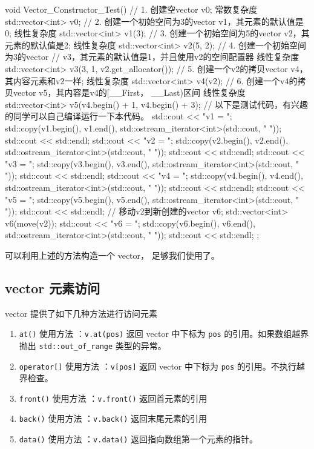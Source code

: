 \begin{cppcode}
void Vector_Constructor_Test() {
  // 1. 创建空vector v0;  常数复杂度
  std::vector<int> v0;
  // 2. 创建一个初始空间为3的vector v1，其元素的默认值是0; 线性复杂度
  std::vector<int> v1(3);
  // 3. 创建一个初始空间为5的vector v2，其元素的默认值是2; 线性复杂度
  std::vector<int> v2(5, 2);
  // 4. 创建一个初始空间为3的vector
  // v3，其元素的默认值是1，并且使用v2的空间配置器 线性复杂度
  std::vector<int> v3(3, 1, v2.get_allocator());
  // 5. 创建一个v2的拷贝vector v4， 其内容元素和v2一样; 线性复杂度
  std::vector<int> v4(v2);
  // 6. 创建一个v4的拷贝vector v5，其内容是v4的[__First， __Last)区间 线性复杂度
  std::vector<int> v5(v4.begin() + 1, v4.begin() + 3);
  // 以下是测试代码，有兴趣的同学可以自己编译运行一下本代码。
  std::cout << "v1 = ";
  std::copy(v1.begin(), v1.end(), std::ostream_iterator<int>(std::cout, " "));
  std::cout << std::endl;
  std::cout << "v2 = ";
  std::copy(v2.begin(), v2.end(), std::ostream_iterator<int>(std::cout, " "));
  std::cout << std::endl;
  std::cout << "v3 = ";
  std::copy(v3.begin(), v3.end(), std::ostream_iterator<int>(std::cout, " "));
  std::cout << std::endl;
  std::cout << "v4 = ";
  std::copy(v4.begin(), v4.end(), std::ostream_iterator<int>(std::cout, " "));
  std::cout << std::endl;
  std::cout << "v5 = ";
  std::copy(v5.begin(), v5.end(), std::ostream_iterator<int>(std::cout, " "));
  std::cout << std::endl;
  // 移动v2到新创建的vector v6;
  std::vector<int> v6(move(v2));
  std::cout << "v6 = ";
  std::copy(v6.begin(), v6.end(), std::ostream_iterator<int>(std::cout, " "));
  std::cout << std::endl;
};
\end{cppcode}

可以利用上述的方法构造一个 vector， 足够我们使用了。

\subsection{vector 元素访问}

vector 提供了如下几种方法进行访问元素

\begin{enumerate}
\item \texttt{at()}
使用方法 ：\texttt{v.at(pos)} 返回 vector 中下标为 \texttt{pos} 的引用。如果数组越界抛出 \texttt{std::out_of_range} 类型的异常。
\item \texttt{operator[]}
使用方法 ：\texttt{v[pos]} 返回 vector 中下标为 \texttt{pos} 的引用。不执行越界检查。
\item \texttt{front()}
使用方法 ：\texttt{v.front()} 返回首元素的引用
\item \texttt{back()}
使用方法 ：\texttt{v.back()} 返回末尾元素的引用
\item \texttt{data()}
使用方法 ：\texttt{v.data()} 返回指向数组第一个元素的指针。
\end{enumerate}

